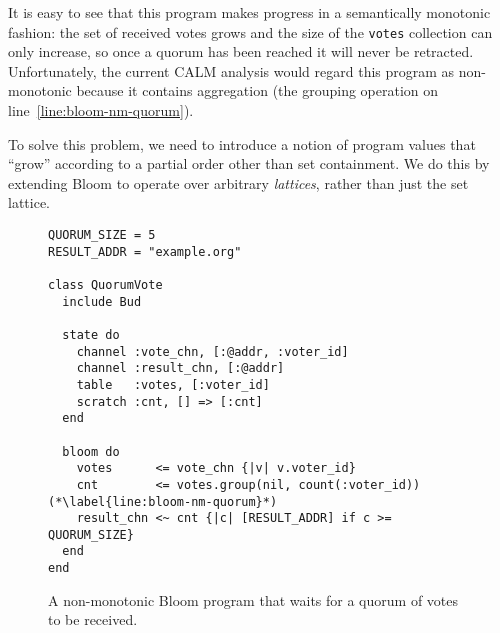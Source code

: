It is easy to see that this program makes progress in a semantically monotonic
fashion: the set of received votes grows and the size of the \texttt{votes}
collection can only increase, so once a quorum has been reached it will never be
retracted. Unfortunately, the current CALM analysis would regard this program as
non-monotonic because it contains aggregation (the grouping operation on
line~\ref{line:bloom-nm-quorum}).

To solve this problem, we need to introduce a notion of program values that
``grow'' according to a partial order other than set containment. We do this by
extending Bloom to operate over arbitrary \emph{lattices}, rather than just the
set lattice.


\begin{figure}[t]
\begin{scriptsize}
\begin{lstlisting}
QUORUM_SIZE = 5
RESULT_ADDR = "example.org"

class QuorumVote
  include Bud

  state do
    channel :vote_chn, [:@addr, :voter_id]
    channel :result_chn, [:@addr]
    table   :votes, [:voter_id]
    scratch :cnt, [] => [:cnt]
  end

  bloom do
    votes      <= vote_chn {|v| v.voter_id}
    cnt        <= votes.group(nil, count(:voter_id)) (*\label{line:bloom-nm-quorum}*)
    result_chn <~ cnt {|c| [RESULT_ADDR] if c >= QUORUM_SIZE}
  end
end
\end{lstlisting}
\end{scriptsize}
\caption{A non-monotonic Bloom program that waits for a quorum of votes to be received.}
\label{fig:bloom-nm-quorum}
\end{figure}
